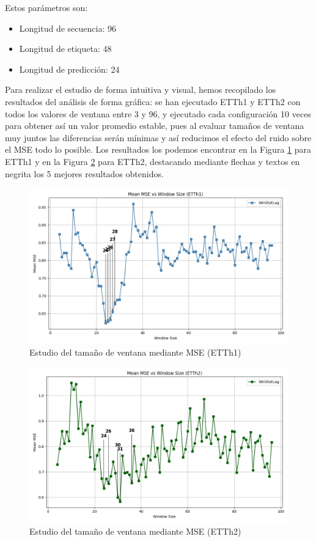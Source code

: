 Estos parámetros son:

\begin{itemize}
	\item Longitud de secuencia: 96
	\item Longitud de etiqueta: 48
	\item Longitud de predicción: 24
\end{itemize}

Para realizar el estudio de forma intuitiva y visual, hemos recopilado los resultados del análisis de forma gráfica: se han ejecutado ETTh1 y ETTh2 con todos los valores de ventana entre 3 y 96, y ejecutado cada configuración 10 veces para obtener así un valor promedio estable, pues al evaluar tamaños de ventana muy juntos las diferencias serán mínimas y así reducimos el efecto del ruido sobre el MSE todo lo posible. Los resultados los podemos encontrar en la Figura \ref{mean_mse_vs_window_ETTh1} para ETTh1 y en la Figura \ref{mean_mse_vs_window_ETTh2} para ETTh2, destacando mediante flechas y textos en negrita los 5 mejores resultados obtenidos.\\


\begin{figure}[H]
	\centering
	\includegraphics[scale=0.475]{img/mean_mse_vs_window_ETTh1}
	\caption{Estudio del tamaño de ventana mediante MSE (ETTh1)}
	\label{mean_mse_vs_window_ETTh1}
\end{figure}


\begin{figure}[H]
	\centering
	\includegraphics[scale=0.475]{img/mean_mse_vs_window_ETTh2}
	\caption{Estudio del tamaño de ventana mediante MSE (ETTh2)}
	\label{mean_mse_vs_window_ETTh2}
\end{figure}

